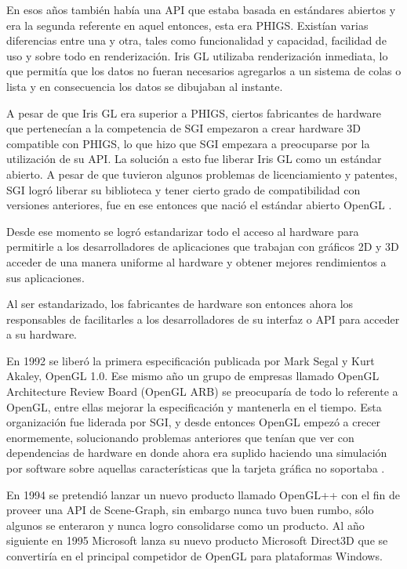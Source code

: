 \documentclass[a4paper,12pt,openany,oneside]{book}
\begin{document}
En esos años también había una API que estaba basada en estándares abiertos y era la segunda referente en aquel entonces, esta era PHIGS. Existían varias diferencias entre una y otra, tales como funcionalidad y capacidad, facilidad de uso y sobre todo en renderización. Iris GL utilizaba renderización inmediata, lo que permitía que los datos no fueran necesarios agregarlos a un sistema de colas o lista y en consecuencia los datos se dibujaban al instante.

A pesar de que Iris GL era superior a PHIGS, ciertos fabricantes de hardware que pertenecían a la competencia de SGI empezaron a crear hardware 3D compatible con PHIGS, lo que hizo que SGI empezara a preocuparse por la utilización de su API. La solución a esto fue liberar Iris GL como un estándar abierto. A pesar de que tuvieron algunos problemas de licenciamiento y patentes, SGI logró liberar su biblioteca y tener cierto grado de compatibilidad con versiones anteriores, fue en ese entonces que nació el estándar abierto OpenGL \cite{WIKI}. 

Desde ese momento se logró estandarizar todo el acceso al hardware para permitirle a los desarrolladores de aplicaciones que trabajan con gráficos 2D y 3D acceder de una manera uniforme al hardware y obtener mejores rendimientos a sus aplicaciones. 

Al ser estandarizado, los fabricantes de hardware son entonces ahora los responsables de facilitarles a los desarrolladores de su interfaz o API para acceder a su hardware.

En 1992 se liberó la primera especificación publicada por Mark Segal y Kurt Akaley, OpenGL 1.0. Ese mismo año un grupo de empresas llamado OpenGL Architecture Review Board (OpenGL ARB) se preocuparía de todo lo referente a OpenGL, entre ellas mejorar la especificación y mantenerla en el tiempo. Esta organización fue liderada por SGI, y desde entonces OpenGL empezó a crecer enormemente, solucionando problemas anteriores que tenían que ver con dependencias de hardware en donde ahora era suplido haciendo una simulación por software sobre aquellas características que la tarjeta gráfica no soportaba \cite{WIKI}.

En 1994 se pretendió lanzar un nuevo producto llamado OpenGL++ con el fin de proveer una API de Scene-Graph, sin embargo nunca tuvo buen rumbo, sólo algunos se enteraron y nunca logro consolidarse como un producto. Al año siguiente en 1995 Microsoft lanza su nuevo producto Microsoft Direct3D que se convertiría en el principal competidor de OpenGL para plataformas Windows. 
\end{document}
